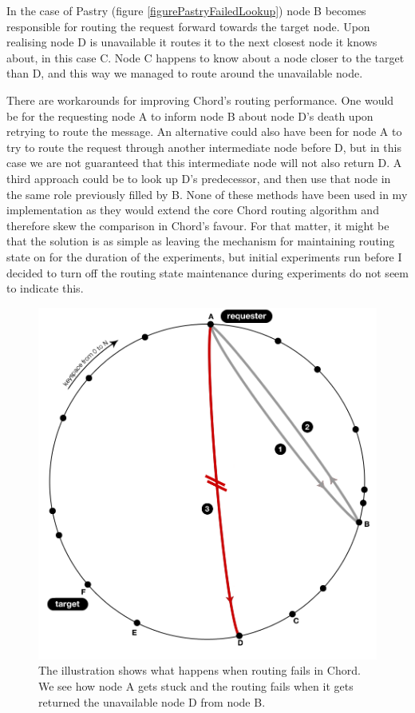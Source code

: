 In the case of Pastry (figure \ref{figurePastryFailedLookup}) node B becomes responsible for routing the request forward towards the target node. Upon realising node D is unavailable it routes it to the next closest node it knows about, in this case C. Node C happens to know about a node closer to the target than D, and this way we managed to route around the unavailable node.

There are workarounds for improving Chord's routing performance. One would be for the requesting node A to inform node B about node D's death upon retrying to route the message. An alternative could also have been for node A to try to route the request through another intermediate node before D, but in this case we are not guaranteed that this intermediate node will not also return D.
A third approach could be to look up D's predecessor, and then use that node in the same role previously filled by B. None of these methods have been used in my implementation as they would extend the core Chord routing algorithm and therefore skew the comparison in Chord's favour.
For that matter, it might be that the solution is as simple as leaving the mechanism for maintaining routing state on for the duration of the experiments, but initial experiments run before I decided to turn off the routing state maintenance during experiments do not seem to indicate this.

\begin{figure}[!htb]
\begin{center}
  \includegraphics[width=0.9\linewidth]{illustrations/ChordRoutingFailed.png}
  \caption{The illustration shows what happens when routing fails in Chord. We see how node A gets stuck and the routing fails when it gets returned the unavailable node D from node B.}
  \label{figureChordFailedLookup}
\end{center}
\end{figure}

